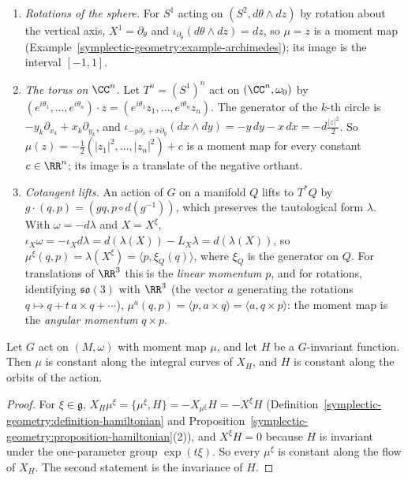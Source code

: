 \begin{example}\label{symplectic-geometry:example-moment-maps}
\begin{enumerate}
\item \emph{Rotations of the sphere.} For $S^1$ acting on $(S^2, d\theta \wedge dz)$ by rotation about the vertical axis, $X^1 = \partial_\theta$ and $\iota_{\partial_\theta}(d\theta \wedge dz) = dz$, so $\mu = z$ is a moment map
(Example~\ref{symplectic-geometry:example-archimedes}); its image is the interval $[-1, 1]$.
\item \emph{The torus on $\CC^n$.} Let $T^n = (S^1)^n$ act on $(\CC^n, \omega_0)$ by $(e^{i\theta_1}, \ldots, e^{i\theta_n}) \cdot z = (e^{i\theta_1}z_1, \ldots, e^{i\theta_n}z_n)$. The generator of the $k$-th circle is
$-y_k\partial_{x_k} + x_k\partial_{y_k}$, and $\iota_{-y\partial_x + x\partial_y}(dx \wedge dy) = -y\,dy - x\,dx = -d\frac{|z|^2}{2}$. So $\mu(z) = -\frac12(|z_1|^2, \ldots, |z_n|^2) + c$ is a moment map for every
constant $c \in \RR^n$; its image is a translate of the negative orthant.
\item \emph{Cotangent lifts.} An action of $G$ on a manifold $Q$ lifts to $T^*Q$ by $g \cdot (q, p) = (gq, p \circ d(g^{-1}))$, which preserves the tautological form $\lambda$. With $\omega = -d\lambda$ and $X = X^\xi$,
$\iota_X\omega = -\iota_Xd\lambda = d(\lambda(X)) - L_X\lambda = d(\lambda(X))$, so $\mu^\xi(q, p) = \lambda(X^\xi) = \langle p, \xi_Q(q)\rangle$, where $\xi_Q$ is the generator on $Q$. For translations of $\RR^3$ this is the
\emph{linear momentum} $p$, and for rotations, identifying $\mathfrak{so}(3)$ with $\RR^3$ (the vector $a$ generating the rotations $q \mapsto q + t\,a \times q + \cdots$), $\mu^a(q, p) = \langle p, a \times q\rangle = \langle a, q \times p\rangle$: the
moment map is the \emph{angular momentum} $q \times p$.
\end{enumerate}
\end{example}

\begin{proposition}\label{symplectic-geometry:proposition-noether}
Let $G$ act on $(M, \omega)$ with moment map $\mu$, and let $H$ be a $G$-invariant function. Then $\mu$ is constant along the integral curves of $X_H$, and $H$ is constant along the orbits of the action.
\end{proposition}

\begin{proof}
For $\xi \in \mathfrak{g}$, $X_H\mu^\xi = \{\mu^\xi, H\} = -X_{\mu^\xi}H = -X^\xi H$ (Definition~\ref{symplectic-geometry:definition-hamiltonian} and Proposition~\ref{symplectic-geometry:proposition-hamiltonian}(2)), and
$X^\xi H = 0$ because $H$ is invariant under the one-parameter group $\exp(t\xi)$. So every $\mu^\xi$ is constant along the flow of $X_H$. The second statement is the invariance of $H$.
\end{proof}

